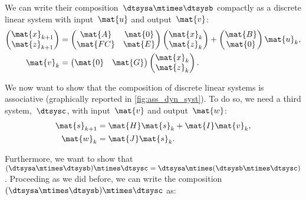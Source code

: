 We can write their composition~$\dtsysa\mtimes \dtsysb$ compactly as a discrete linear system with input~$\mat{u}$ and output~$\mat{v}$:
%
\begin{equation*}
    \label{eq:dlin-3}
    \begin{aligned}
        \begin{pmatrix}
            \mat{x}_{k+1} \\
            \mat{z}_{k+1}
        \end{pmatrix} & =
        \begin{pmatrix}
            \mat{A}  & \mat{0} \\
            \mat{FC} & \mat{E}
        \end{pmatrix}
        \begin{pmatrix}
            \mat{x}_k \\ \mat{z}_k
        \end{pmatrix}
        +
        \begin{pmatrix}
            \mat{B} \\ \mat{0}
        \end{pmatrix}\mat{u}_k, \\
        \mat{v}_k        & =
        \begin{pmatrix}
            \mat{0} & \mat{G}
        \end{pmatrix}
        \begin{pmatrix}
            \mat{x}_k \\ \mat{z}_k
        \end{pmatrix}.
    \end{aligned}
\end{equation*}

We now want to show that the composition of discrete linear systems is associative (graphically reported in \cref{fig:ass_dyn_syst}).
To do so, we need a third system,~$\dtsysc$, with input~$\mat{v}$ and output~$\mat{w}$:
\begin{equation*}
    \label{eq:dlin-4}
    \begin{aligned}
        \mat{s}_{k+1} & = \mat{H} \mat{s}_k + \mat{I} \mat{v}_k, \\
        \mat{w}_{k}   & = \mat{J} \mat{s}_k.
    \end{aligned}
\end{equation*}

Furthermore, we want to show that~$(\dtsysa\mtimes \dtsysb)\mtimes \dtsysc=\dtsysa\mtimes (\dtsysb\mtimes \dtsysc)$.
Proceeding as we did before, we can write the composition~$(\dtsysa\mtimes \dtsysb)\mtimes \dtsysc$ as:

